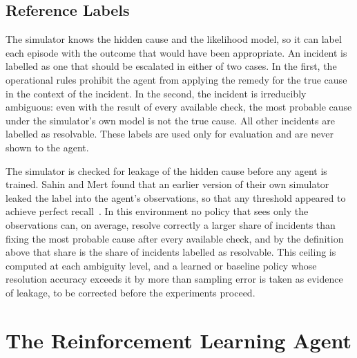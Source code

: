 \subsection{Reference Labels}
\label{sec:labels}

The simulator knows the hidden cause and the likelihood model, so it can label each episode with the outcome that would have been appropriate. An incident is labelled as one that should be escalated in either of two cases. In the first, the operational rules prohibit the agent from applying the remedy for the true cause in the context of the incident. In the second, the incident is irreducibly ambiguous: even with the result of every available check, the most probable cause under the simulator's own model is not the true cause. All other incidents are labelled as resolvable. These labels are used only for evaluation and are never shown to the agent.

The simulator is checked for leakage of the hidden cause before any agent is trained. Sahin and Mert found that an earlier version of their own simulator leaked the label into the agent's observations, so that any threshold appeared to achieve perfect recall~\cite{sahin2026}. In this environment no policy that sees only the observations can, on average, resolve correctly a larger share of incidents than fixing the most probable cause after every available check, and by the definition above that share is the share of incidents labelled as resolvable. This ceiling is computed at each ambiguity level, and a learned or baseline policy whose resolution accuracy exceeds it by more than sampling error is taken as evidence of leakage, to be corrected before the experiments proceed.

\section{The Reinforcement Learning Agent}
\label{sec:agent}

